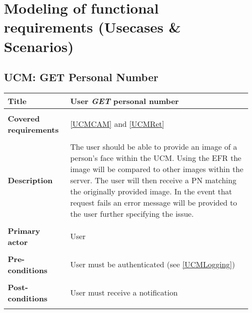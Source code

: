\documentclass[a4paper,11pt]{article}
\begin{document}
\newpage
\section{Modeling of functional requirements (Usecases \& Scenarios)}


\subsection{UCM: GET Personal Number}

\begin{tabular}{|p{3.5cm}|p{11.5cm}|} \hline
    \textbf{Title} &  User \emph{GET} personal number 
        
    \\ \hline \rowcolor{Gray} & \\ \hline
        
    \textbf{Covered requirements} &  \ref{UCMCAM} and \ref{UCMRet}
        
    \\ \hline \rowcolor{Gray} & \\ \hline
        
    \textbf{Description} &  The user should be able to provide an image of a person's face within the UCM. Using the EFR the image will be compared to other images within the server. The user will then receive a PN matching the originally provided image. In the event that request fails an error message will be provided to the user further specifying the issue.
        
    \\ \hline \rowcolor{Gray} & \\ \hline
        
    \textbf{Primary actor} & User  
        
    \\ \hline \rowcolor{Gray} & \\ \hline 
          
    \textbf{Pre-conditions} &   User must be authenticated (see \ref{UCMLogging})
        
    \\ \hline \rowcolor{Gray} & \\ \hline
         
    \textbf{Post-conditions} &   User must receive a notification
        
    \\ \hline \rowcolor{Gray} & \\ \hline 
         

\end{tabular}
\end{document}

